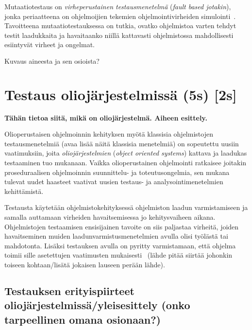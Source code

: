\documentclass[finnish, grading]{tktltiki2}
\theoremstyle{definition}
\theoremstyle{remark}
\begin{document}
%

Mutaatiotestaus on \textit{virheperustainen testausmenetelmä} (\textit{fault based jotakin}), jonka periaatteena on ohjelmoijien tekemien ohjelmointivirheiden simulointi~\cite[s. 649]{Jia:Harman:2011}. Tavoitteena mutaatiotestauksessa on tutkia, ovatko ohjelmistoa varten tehdyt testit laadukkaita ja havaitaanko niillä kattavasti ohjelmistossa mahdollisesti esiintyvät virheet ja ongelmat. 

Kuvaus aineesta ja sen osioista?


\section{Testaus oliojärjestelmissä (5s) [2s]}

\textbf{Tähän tietoa siitä, mikä on oliojärjestelmä. Aiheen esittely.}

Olioperustaisen ohjelmoinnin kehityksen myötä klassisia ohjelmistojen testausmenetelmiä (avaa lisää näitä klassisia menetelmiä) on sopeutettu uusiin vaatimuksiin, joita \textit{oliojärjestelmien} (\textit{object oriented systems}) kattava ja laadukas testaaminen tuo mukanaan. Vaikka olioperustainen ohjelmointi ratkaisee joitakin proseduraalisen ohjelmoinnin suunnittelu- ja toteutusongelmia, sen mukana tulevat uudet haasteet vaativat uusien testaus- ja analysointimenetelmien kehittämistä. 

Testausta käytetään ohjelmistokehityksessä ohjelmiston laadun varmistamiseen ja samalla auttamaan virheiden havaitsemisessa jo kehitysvaiheen aikana. Ohjelmistojen testaamisen ensisijainen tavoite on siis paljastaa virheitä, joiden havaitseminen muiden laadunvarmistusmenetelmien avulla olisi työlästä tai mahdotonta. Lisäksi testauksen avulla on pyritty varmistamaan, että ohjelma toimii sille asetettujen vaatimusten mukaisesti~\cite[s. 59]{Binder:1999} (lähde pitää siirtää johonkin toiseen kohtaan/lisätä jokaisen lauseen perään lähde). 

\subsection{Testauksen erityispiirteet oliojärjestelmissä/yleisesittely (onko tarpeellinen omana osionaan?)}
\end{document}
